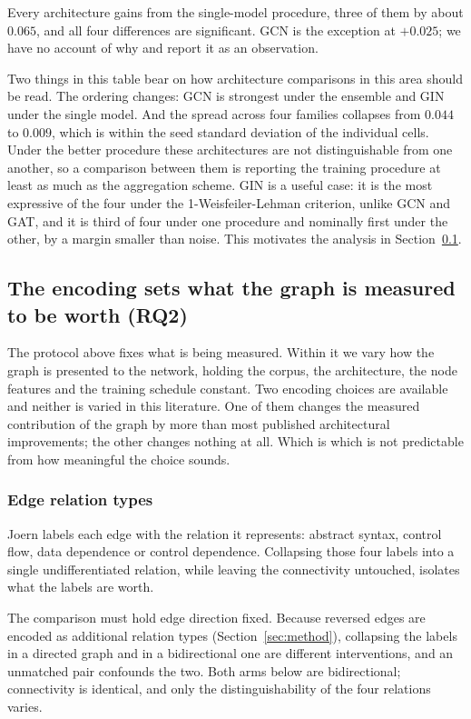 Every architecture gains from the single-model procedure, three of them by
about $0.065$, and all four differences are significant. GCN is the exception at
$+0.025$; we have no account of why and report it as an observation.

Two things in this table bear on how architecture comparisons in this area
should be read. The ordering changes: GCN is strongest under the ensemble and
GIN under the single model. And the spread across four families collapses from
$0.044$ to $0.009$, which is within the seed standard deviation of the
individual cells. Under the better procedure these architectures are not
distinguishable from one another, so a comparison between them is reporting the
training procedure at least as much as the aggregation scheme. GIN is a useful
case: it is the most expressive of the four under the 1-Weisfeiler-Lehman
criterion, unlike GCN and GAT, and it is third of four under one procedure and
nominally first under the other, by a margin smaller than noise. This motivates
the analysis in Section~\ref{sec:graph-worth}.

\subsection{The encoding sets what the graph is measured to be worth (\textbf{RQ2})}
\label{sec:graph-worth}

The protocol above fixes what is being measured. Within it we vary how the
graph is presented to the network, holding the corpus, the architecture, the
node features and the training schedule constant. Two encoding choices are
available and neither is varied in this literature. One of them changes the
measured contribution of the graph by more than most published architectural
improvements; the other changes nothing at all. Which is which is not
predictable from how meaningful the choice sounds.

\subsubsection{Edge relation types}
Joern labels each edge with the relation it represents: abstract syntax, control
flow, data dependence or control dependence. Collapsing those four labels into a
single undifferentiated relation, while leaving the connectivity untouched,
isolates what the labels are worth.

The comparison must hold edge direction fixed. Because reversed edges are
encoded as additional relation types (Section~\ref{sec:method}), collapsing the
labels in a directed graph and in a bidirectional one are different
interventions, and an unmatched pair confounds the two. Both arms below are
bidirectional; connectivity is identical, and only the distinguishability of the
four relations varies.

